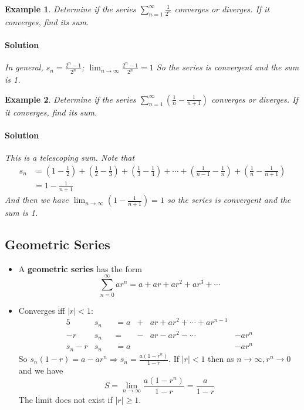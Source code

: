 \documentclass[letterpaper, 11pt, openany]{book}
\theoremstyle{mytheoremstyle}
\theoremstyle{myexamplestyle}
\newtheorem{example}{Example}[section]
\newenvironment{solution}{\paragraph{\sffamily \smaller \fontseries{b}\selectfont Solution}}{\hfill\faSquare}
\begin{document}
\begin{example}\label{e:seriesexp}
    Determine if the series $\displaystyle \sum_{n=1}^{\infty} \frac{1}{2^{n}}$ converges or diverges. If it converges, find its sum.
    
    \begin{solution}
        In general, $\displaystyle s_{n} = \frac{2^{n} - 1}{2^{n}}$; $\displaystyle \lim_{n \to \infty} \frac{2^{n} - 1}{2^{n}} = 1$ So the series is convergent and the sum is 1.
    \end{solution}
\end{example}

\begin{example}\label{e:seriestelsum}
    Determine if the series $\displaystyle \sum_{n=1}^{\infty} \left( \frac{1}{n} - \frac{1}{n+1} \right)$ converges or diverges. If it converges, find its sum.
    
    \begin{solution}
        This is a telescoping sum. Note that
        \begin{align*}
            s_{n}   &= \left( 1 - \frac{1}{2} \right) + \left( \frac{1}{2} - \frac{1}{3} \right) + \left( \frac{1}{3} - \frac{1}{4} \right) + \cdots +  \left( \frac{1}{n-1} - \frac{1}{n} \right) + \left( \frac{1}{n} - \frac{1}{n+1} \right)\\
                    &= 1 - \frac{1}{n+1}
        \end{align*}
        And then we have $\displaystyle \lim_{n \to \infty} \left( 1 -  \frac{1}{n+1}\right) = 1$ so the series is convergent and the sum is 1.
    \end{solution}
\end{example}

\subsection{Geometric Series}
\begin{itemize}
    \item A \textbf{geometric series} has the form
    \[\sum_{n=0}^{\infty} a r^{n} = a + ar + ar^{2} + ar^{3} + \cdots\]
    \item Converges iff $|r| < 1$:
    \begin{alignat*}{5}
        &s_{n}          & &= a {}&{}+{}  &ar {}+{} ar^{2} + \cdots + ar^{n-1} &{}\\
        -r&s_{n}        & &=     {}&{}-{}&ar {}-{} ar^{2} - \cdots              &-ar^{n}\\
        s_{n} - r&s_{n} & &= a &{}&{} &-ar^{n}
    \end{alignat*}
    So $s_{n}(1-r) = a - ar^{n} \Rightarrow s_{n} = \frac{a(1-r^{n})}{1-r}$. If  $|r| < 1$ then as $n \to \infty, r^{n} \to 0$ and we have
    \[S = \lim_{n \to \infty} \frac{a(1-r^{n})}{1-r} = \frac{a}{1 - r}\]
    The limit does not exist if $|r| \geq 1$.
\end{itemize}
\end{document}
